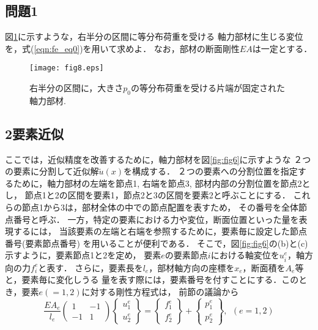 \documentclass[10pt,a4j]{jarticle}
\begin{document}
\subsection{問題1}
図\ref{fig:fig8}に示すような，右半分の区間に等分布荷重を受ける
軸力部材に生じる変位を，式(\ref{eqn:fe_eq0})を用いて求めよ．
なお，部材の断面剛性$EA$は一定とする．
\begin{figure}[h]
	\begin{center}
	\texttt{[image: fig8.eps]} 
	\end{center}
	\caption{右半分の区間に，大きさ$p_0$の等分布荷重を受ける片端が固定された軸力部材.} 
	\label{fig:fig8}
\end{figure}
\subsection{2要素近似}
ここでは，近似精度を改善するために，軸力部材を図\ref{fig:fig6}に示すような
２つの要素に分割して近似解$\tilde u(x)$を構成する．
２つの要素への分割位置を指定するために，軸力部材の左端を節点1, 
右端を節点3, 部材内部の分割位置を節点2とし，
節点1と2の区間を要素1，節点2と3の区間を要素2と呼ぶことにする．
これらの節点1から3は，部材全体の中での節点配置を表すため，
その番号を全体節点番号と呼ぶ．
一方，特定の要素における力や変位，断面位置といった量を表現するには，
当該要素の左端と右端を参照するために，要素毎に設定した節点番号(要素節点番号)
を用いることが便利である．
そこで，図\ref{fig:fig6}の(b)と(c)示すように，要素節点1と2を定め，
要素$e$の要素節点$i$における軸変位を$u^e_i$，軸方向の力$f^e_i$と表す．
さらに，要素長を$l_e$，部材軸方向の座標を$x_e$，断面積を$A_e$等と，要素毎に変化しうる
量を表す際には，要素番号を付すことにする．このとき，要素$e(=1,2)$に対する剛性方程式は，
前節の議論から
\begin{equation}
	\frac{EA_e}{l_e}
	\left(
	\begin{array}{cc}
		1 & -1  \\
		-1 & 1 
	\end{array}
	\right)
	\left\{
	\begin{array}{c}
		u^e_1 \\
		u^e_2
	\end{array}
	\right\}
	=
	\left\{
	\begin{array}{c}
		f^e_1  \\
		f^e_2 
	\end{array}
	\right\}
	+
	\left\{
	\begin{array}{c}
		p^e_1 \\
		p^e_2 
	\end{array}
	\right\}, 
	\ \ 
	(e=1,2)
	\label{eqn:fe_eq_e}
\end{equation}
\end{document}
